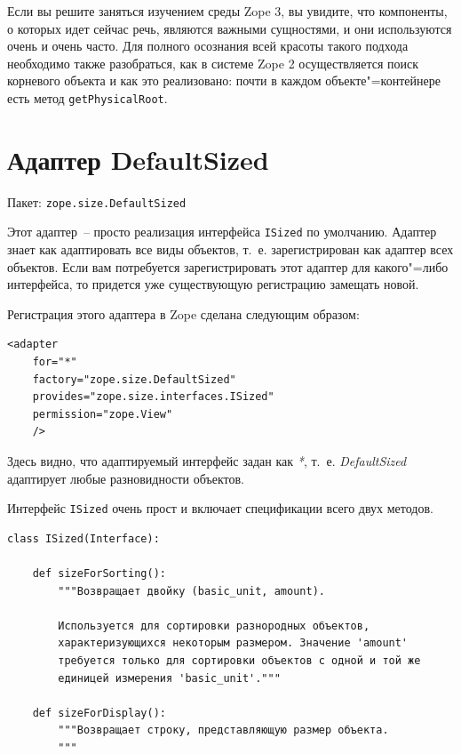 \documentclass[a4paper,openany,twoside,draft]{book}
\providecommand*{\DUroletitlereference}[1]{\textsl{#1}}
\begin{document}
Если вы решите заняться изучением среды Zope 3, вы увидите, что компоненты, о которых идет сейчас речь, являются важными сущностями, и они используются очень и очень часто.  Для полного осознания всей красоты такого подхода необходимо также разобраться, как в системе Zope 2 осуществляется поиск корневого объекта и как это реализовано: почти в каждом объекте"=контейнере есть метод \texttt{getPhysicalRoot}.


\section{Адаптер DefaultSized%
  \label{defaultsized}%
}

Пакет: \texttt{zope.size.DefaultSized}

Этот адаптер~-- просто реализация интерфейса \texttt{ISized} по умолчанию.  Адаптер \textquotedbl{}знает\textquotedbl{} как адаптировать все виды объектов, т.~е. зарегистрирован как адаптер всех объектов.  Если вам потребуется зарегистрировать этот адаптер для какого"=либо интерфейса, то придется уже существующую регистрацию замещать новой.

Регистрация этого адаптера в Zope сделана следующим образом:

\begin{verbatim}
<adapter
    for="*"
    factory="zope.size.DefaultSized"
    provides="zope.size.interfaces.ISized"
    permission="zope.View"
    />
\end{verbatim}

Здесь видно, что адаптируемый интерфейс задан как \DUroletitlereference{*}, т.~е. \DUroletitlereference{DefaultSized} адаптирует любые разновидности объектов.

Интерфейс \texttt{ISized} очень прост и включает спецификации всего двух методов.

\begin{verbatim}
class ISized(Interface):

    def sizeForSorting():
        """Возвращает двойку (basic_unit, amount).

        Используется для сортировки разнородных объектов,
        характеризующихся некоторым размером. Значение 'amount'
        требуется только для сортировки объектов с одной и той же
        единицей измерения 'basic_unit'."""

    def sizeForDisplay():
        """Возвращает строку, представляющую размер объекта.
        """
\end{verbatim}
\end{document}
